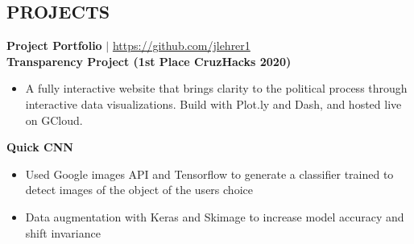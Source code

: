 \documentclass[margin]{res}
\begin{document}
\begin{resume}
\section{PROJECTS}
    \textbf{Project Portfolio} $\mid$ \textcolor{blue}{\href{https://github.com/jlehrer1}{https://github.com/jlehrer1}} \vspace {2mm} \\
    \textbf{Transparency Project (1st Place CruzHacks 2020)}
    \begin{itemize}
        \item A fully interactive website that brings clarity to the political process through interactive data visualizations. Build with Plot.ly and Dash, and hosted live on GCloud.
    \end{itemize}\vspace*{-8pt}
    \textbf{Quick CNN}
    \begin{itemize}
        \item Used Google images API and Tensorflow to generate a classifier  trained to detect images of the object of the users choice
        \item Data augmentation with Keras and Skimage to increase model accuracy and shift invariance
    \end{itemize}\vspace*{-8pt}


\end{resume}
\end{document}
